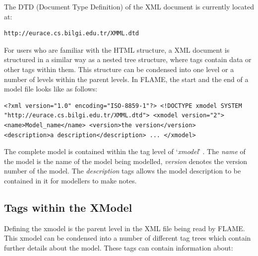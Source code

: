 \documentclass[a4paper,11pt]{article}
\newenvironment{mylisting}
{\begin{list}{}{\setlength{\leftmargin}{1em}}\item\small\bfseries}
{\end{list}}
\begin{document}
The DTD (Document Type Definition) of the XML document is currently
located at:

\begin{mylisting}
\begin{verbatim}
http://eurace.cs.bilgi.edu.tr/XMML.dtd
\end{verbatim}
\end{mylisting}

For users who are familiar with the HTML structure, a XML document
is structured in a similar way as a nested tree structure, where
tags contain data or other tags within them. This structure can be
condensed into one level or a number of levels within the parent
levels. In FLAME, the start and the end of a model file looks like
as follows:

\begin{mylisting}
\begin{verbatim}
<?xml version="1.0" encoding="ISO-8859-1"?> <!DOCTYPE xmodel SYSTEM
"http://eurace.cs.bilgi.edu.tr/XMML.dtd"> <xmodel version="2">
<name>Model_name</name> <version>the version</version>
<description>a description</description> ... </xmodel>
\end{verbatim}
\end{mylisting}

The complete model is contained within the tag level of
`\emph{xmodel}' . The \emph{name} of the model is the name of the
model being modelled, \emph{version} denotes the version number of
the model. The \emph{description} tags allows the model description
to be contained in it for modellers to make notes.

\subsection{Tags within the XModel}
Defining the xmodel is the parent level in the XML file being read
by FLAME. This xmodel can be condensed into a number of different
tag trees which contain further details about the model. These tags
can contain information about:
\end{document}

